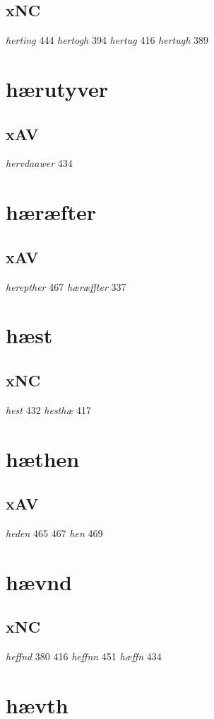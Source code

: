 \documentclass[a4paper,twocolumn]{article}
\begin{document}
\subsection{xNC}
\label{sec:org9bce253}
\emph{herting} 444 \emph{hertogh} 394 \emph{hertug} 416 \emph{hertugh} 389 
\section{hærutyver}
\label{sec:org9beceac}
\subsection{xAV}
\label{sec:org2c269be}
\emph{hervdaawer} 434 
\section{hæræfter}
\label{sec:org837c580}
\subsection{xAV}
\label{sec:org0d2a447}
\emph{herepther} 467 \emph{hæræffter} 337 
\section{hæst}
\label{sec:org5119f2b}
\subsection{xNC}
\label{sec:orga1a997a}
\emph{hest} 432 \emph{hesthæ} 417 
\section{hæthen}
\label{sec:orgc143b14}
\subsection{xAV}
\label{sec:org302246b}
\emph{heden} 465 467 \emph{hen} 469 
\section{hævnd}
\label{sec:org1be2c3d}
\subsection{xNC}
\label{sec:org3d43d20}
\emph{heffnd} 380 416 \emph{heffnn} 451 \emph{hæffn} 434 
\section{hævth}
\label{sec:orgdbc2e0a}
\end{document}
